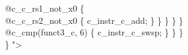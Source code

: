 {\indent \hspace{\parindent} \hspace{\parindent} \hspace{\parindent} \hspace{\parindent} \hspace{\parindent} @c\_c\_rs1\_not\_x0 \{\\%
\indent \hspace{\parindent} \hspace{\parindent} \hspace{\parindent} \hspace{\parindent} \hspace{\parindent} \hspace{\parindent} @c\_c\_rs2\_not\_x0 \{ c\_instr\_c\_add; \} \} \} \} \}\\%
\indent \hspace{\parindent} \hspace{\parindent} @c\_cmp(funct3\_c, 6) \{ c\_instr\_c\_swsp; \} \} \}\\%
\} "\textgreater\\%
}
